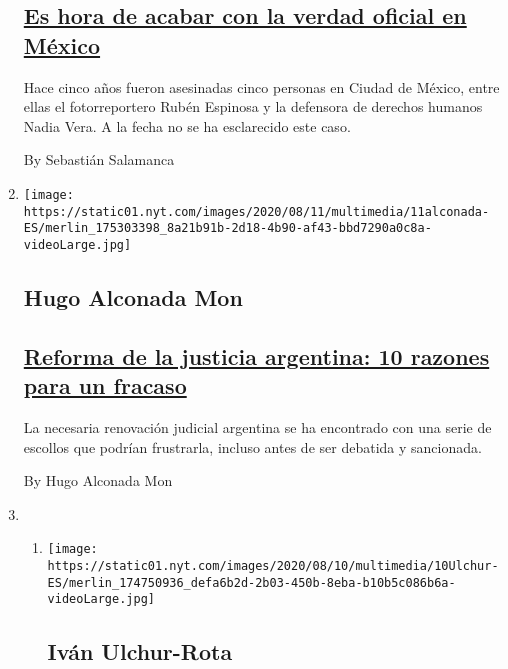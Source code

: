 \begin{enumerate}
{  \subsection{\texorpdfstring{\href{/es/2020/08/12/espanol/opinion/violencia-periodistas-mexico.html}{Es
  hora de acabar con la verdad oficial en
  México}}{Es hora de acabar con la verdad oficial en México}}\label{es-hora-de-acabar-con-la-verdad-oficial-en-muxe9xico}}

  Hace cinco años fueron asesinadas cinco personas en Ciudad de México,
  entre ellas el fotorreportero Rubén Espinosa y la defensora de
  derechos humanos Nadia Vera. A la fecha no se ha esclarecido este
  caso.

  By Sebastián Salamanca
\item
  \texttt{[image: https://static01.nyt.com/images/2020/08/11/multimedia/11alconada-ES/merlin\_175303398\_8a21b91b-2d18-4b90-af43-bbd7290a0c8a-videoLarge.jpg]}

  \hypertarget{hugo-alconada-mon}{%
  \subsection{Hugo Alconada Mon}\label{hugo-alconada-mon}}

  \hypertarget{reforma-de-la-justicia-argentina-10-razones-para-un-fracaso}{%
  \subsection{\texorpdfstring{\href{/es/2020/08/11/espanol/opinion/argentina-justicia-reforma.html}{Reforma
  de la justicia argentina: 10 razones para un
  fracaso}}{Reforma de la justicia argentina: 10 razones para un fracaso}}\label{reforma-de-la-justicia-argentina-10-razones-para-un-fracaso}}

  La necesaria renovación judicial argentina se ha encontrado con una
  serie de escollos que podrían frustrarla, incluso antes de ser
  debatida y sancionada.

  By Hugo Alconada Mon
\item
  \begin{enumerate}
  \def\labelenumii{\arabic{enumii}.}
  \item
    \texttt{[image: https://static01.nyt.com/images/2020/08/10/multimedia/10Ulchur-ES/merlin\_174750936\_defa6b2d-2b03-450b-8eba-b10b5c086b6a-videoLarge.jpg]}

    \hypertarget{ivuxe1n-ulchur-rota}{%
    \subsection{Iván Ulchur-Rota}\label{ivuxe1n-ulchur-rota}}


\end{enumerate}
\end{enumerate}
